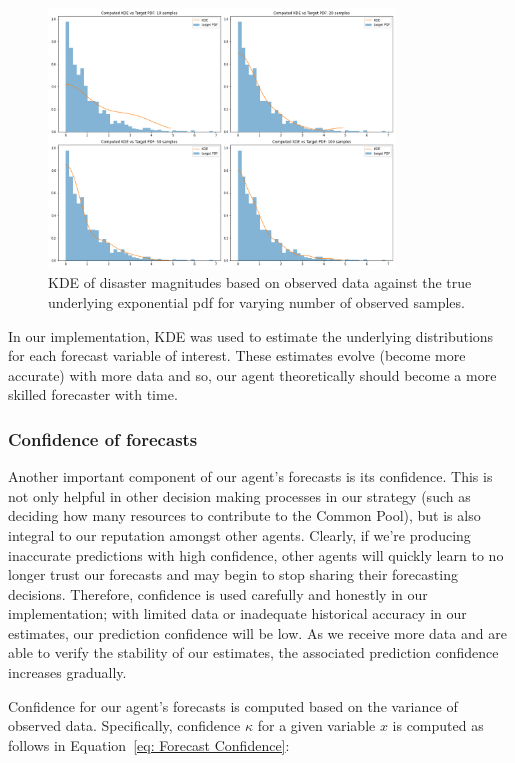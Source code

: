 \begin{figure}[!htb]
    \centering
    \includegraphics[width=0.82\textwidth]{13_team5_agentdesign/images/kde_plots_exp_deer_sizes.png}
    \caption{KDE of disaster magnitudes based on observed data against the true underlying exponential pdf for varying number of observed samples.}
    \label{fig:kde-exp}
\end{figure}

In our implementation, KDE was used to estimate the underlying distributions for each forecast variable of interest. These estimates evolve (become more accurate) with more data and so, our agent theoretically should become a more skilled forecaster with time.

\newpage
\subsubsection{Confidence of forecasts}
Another important component of our agent's forecasts is its confidence. This is not only helpful in other decision making processes in our strategy (such as deciding how many resources to contribute to the Common Pool), but is also integral to our reputation amongst other agents. Clearly, if we're producing  inaccurate predictions with high confidence, other agents will quickly learn to no longer trust our forecasts and may begin to stop sharing their forecasting decisions. Therefore, confidence is used carefully and honestly in our implementation; with limited data or inadequate historical accuracy in our estimates, our prediction confidence will be low. As we receive more data and are able to verify the stability of our estimates, the associated prediction confidence increases gradually. 

Confidence for our agent's forecasts is computed based on the variance of observed data. Specifically, confidence $\kappa$ for a given variable $x$ is computed as follows in Equation~\ref{eq: Forecast Confidence}:

